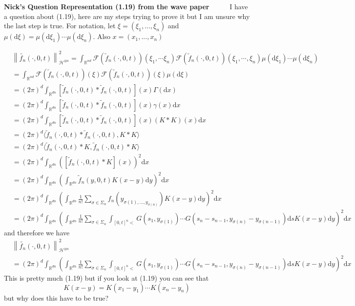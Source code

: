 \documentclass[a4paper,11pt]{article}
\numberwithin{equation}{section}
\theoremstyle{plain}
\theoremstyle{definition}
\newcommand{\ud}{\ensuremath{\mathrm{d} }}
\newcommand{\Norm}[1]{\left\|  #1   \right\|}
\newcommand{\R}{\mathbb{R}}
\newcounter{NQ}
\newenvironment{NickQuestion}[1][] %
{\refstepcounter{NQ}
	\begin{mdframed}[backgroundcolor=lightgray]\textbf{Nick's Question \theNQ \: #1~~}~~~\noindent}%
	{\end{mdframed}}
\numberwithin{NQ}{section}
\numberwithin{LQ}{section}
\numberwithin{ZQ}{section}
\begin{document}
	\begin{NickQuestion}[Representation (1.19) from the wave paper]
		I have a question about (1.19), here are my steps trying to prove it but I am unsure why the last step is true. For notation, let $\xi = (\xi_1,...,\xi_n)$ and $\mu(\ud \xi) = \mu(\ud \xi_1)\cdots \mu(\ud \xi_n)$. Also $x = (x_1,...,x_n)$

		\begin{align*}
		&\Norm{\tilde{f_n}(\cdot,0,t)}_{\mathcal{H}^{\otimes n}}^2 = \int_{\R^{nd}} \mathcal{F}(\tilde{f}_n(\cdot, 0, t))(\xi_1,\cdots \xi_n)\mathcal{F}(\tilde{f}_n(\cdot, 0, t))(\xi_1,\cdots, \xi_n) \mu (\ud \xi_1)\cdots \mu(\ud \xi_n)
		\\&= \int_{\R^{nd}} \mathcal{F}(\tilde{f}_n(\cdot, 0, t))(\xi)\mathcal{F}(\tilde{f}_n(\cdot, 0, t))(\xi) \mu (\ud \xi)
		\\&= (2 \pi)^d \int_{\R^{dn}} [\tilde{f}_n(\cdot, 0, t) * \tilde{f}_n(\cdot, 0, t)](x) \Gamma(\ud x)
		\\& = (2 \pi)^d \int_{\R^{dn}} [\tilde{f}_n(\cdot, 0, t) * \tilde{f}_n(\cdot, 0, t)](x) \gamma( x) \ud x
		\\&= (2 \pi)^d \int_{\R^{dn}} [\tilde{f}_n(\cdot, 0, t) * \tilde{f}_n(\cdot, 0, t)](x) (K*K)(x) \ud x
		\\&= (2 \pi)^d\langle \tilde{f}_n(\cdot,0,t) *\tilde{f}_n(\cdot,0,t), K*K\rangle
		\\&=(2 \pi)^d \langle \tilde{f}_n(\cdot,0,t) *K, \tilde{f}_n(\cdot,0,t)*K\rangle
		\\& = (2 \pi)^d  \int_{\R^{dn}} \left( [\tilde{f}_n(\cdot,0,t)*K](x) \right)^2 \ud x
		\\& = (2 \pi)^d  \int_{\R^{dn}} \left( \int_{\R^{dn}}\tilde{f}_n(y,0,t)K(x-y) \ud y \right)^2 \ud x
		\\& = (2 \pi)^d  \int_{\R^{dn}} \left( \int_{\R^{dn}}\frac{1}{n!}\sum_{\sigma \in \Sigma_n}  f_n(y_{\sigma(1),...,y_{\sigma(n)}}) K(x-y) \ud y \right)^2 \ud x
		\\& = (2 \pi)^d  \int_{\R^{dn}} \left( \int_{\R^{dn}}\frac{1}{n!}\sum_{\sigma \in \Sigma_n}  \int_{[0,t]^n<} G(s_1,y_{\sigma(1)}) \cdots G(s_n-s_{n-1},y_{\sigma(n)}-y_{\sigma(n-1)}) \ud s  K(x-y) \ud y \right)^2 \ud x
		\end{align*}
		and therefore we have
		\begin{align}
		&\Norm{\tilde{f_n}(\cdot,0,t)}_{\mathcal{H}^{\otimes n}}^2 \nonumber
		\\& = (2 \pi)^d  \int_{\R^{dn}} \left( \int_{\R^{dn}}\frac{1}{n!}\sum_{\sigma \in \Sigma_n}  \int_{[0,t]^n<} G(s_1,y_{\sigma(1)}) \cdots G(s_n-s_{n-1},y_{\sigma(n)}-y_{\sigma(n-1)}) \ud s  K(x-y) \ud y \right)^2 \ud x \label{rep}
		\end{align}
		This is pretty much (1.19) but if you look at (1.19) you can see that
		\[
		K(x-y) = K(x_1-y_1)\cdots K(x_n-y_n)
		\]
		but why does this have to be true?
	\end{NickQuestion}
\end{document}
